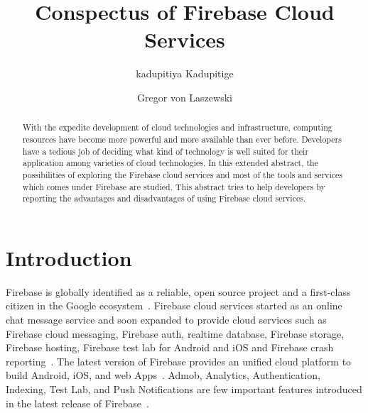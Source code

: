 
\title{Conspectus of Firebase Cloud Services}


\author{kadupitiya Kadupitige}

\author{Gregor von Laszewski}


\renewcommand{\shortauthors}{G. v. Laszewski}


\begin{abstract}
With the expedite development of cloud technologies and infrastructure,
computing resources have become more powerful and more available than ever
before. Developers have a tedious job of deciding what kind of technology is
well suited for their application among varieties of cloud technologies. In this
extended abstract, the possibilities of exploring the Firebase cloud services and most of
the tools and services which comes under Firebase are studied. This abstract tries
to help developers by reporting the advantages and disadvantages of using
Firebase cloud services.
\end{abstract}



\maketitle


\section{Introduction}

Firebase is globally identified as a reliable, open source project and a
first-class citizen in the Google ecosystem~\cite{hid-sp18-409-www-firebase}.
Firebase cloud services started as an online chat message service and soon
expanded to provide cloud services such as Firebase cloud messaging, Firebase
auth, realtime database, Firebase storage, Firebase hosting, Firebase test lab
for Android and iOS and Firebase crash
reporting~\cite{hid-sp18-409-www-firebase-official}. The latest version of
Firebase provides an unified cloud platform to build Android, iOS, and web
Apps~\cite{hid-sp18-409-www-firebase-official}.  Admob, Analytics,
Authentication, Indexing, Test Lab, and Push Notifications are few important
features introduced in the latest release of
Firebase~\cite{hid-sp18-409-www-firebase-official}.

